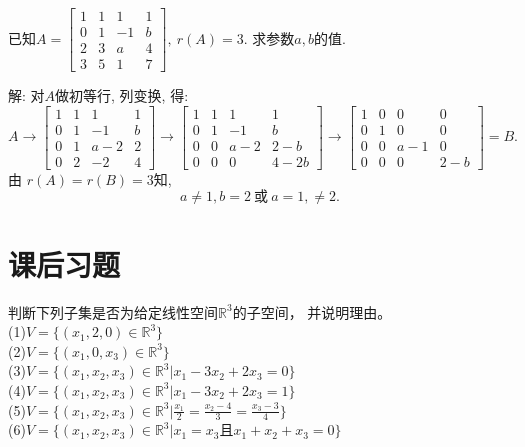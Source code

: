 \begin{eg}
已知$A=\begin{bmatrix}1&1&1&1\\0&1&-1&b\\2&3&a&4\\3&5&1&7\end{bmatrix},\ r(A)=3$. 求参数$a,b$的值.
\end{eg}
解: 对$A$做初等行, 列变换, 得:
\begin{displaymath}
A\rightarrow\begin{bmatrix}1&1&1&1\\0&1&-1&b\\0&1&a-2&2\\0&2&-2&4\end{bmatrix}
\rightarrow\begin{bmatrix}1&1&1&1\\0&1&-1&b\\0&0&a-2&2-b\\0&0&0&4-2b\end{bmatrix}
\rightarrow\begin{bmatrix}1&0&0&0\\0&1&0&0\\0&0&a-1&0\\0&0&0&2-b\end{bmatrix}=B.
\end{displaymath}
由 $r(A)=r(B)=3$知,
$$a\not= 1, b=2\ \mbox{或}\ a=1,\not=2.$$


\section{课后习题}

\begin{ex}\label{4.1}
判断下列子集是否为给定线性空间$\mathbb{R}^3$的子空间， 并说明理由。\\
(1)$V=\{(x_1,2,0)\in \mathbb{R}^3\}$\\
(2)$V=\{(x_1,0,x_3)\in \mathbb{R}^3\}$\\
(3)$V=\{(x_1,x_2,x_3)\in \mathbb{R}^3| x_1-3x_2+2x_3=0\}$\\
(4)$V=\{(x_1,x_2,x_3)\in \mathbb{R}^3| x_1-3x_2+2x_3=1\}$\\
(5)$V=\{(x_1,x_2,x_3)\in \mathbb{R}^3|\frac{x_1}{2}=\frac{x_2-4}{3}=\frac{x_3-3}{4}\}$\\
(6)$V=\{(x_1,x_2,x_3)\in \mathbb{R}^3|x_1=x_3\mbox{且}x_1+x_2+x_3=0\}$
\end{ex}

